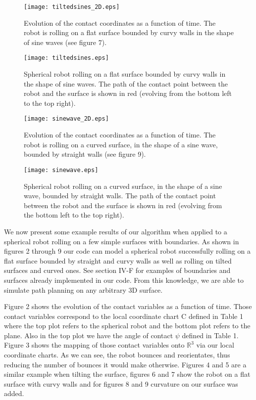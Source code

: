 \documentclass[journal]{IEEEtran}
\begin{document}
\begin{figure}
\centering
    \texttt{[image: tiltedsines\_2D.eps]}
    \caption{Evolution of the contact coordinates as a function of time. The robot is rolling on a flat surface bounded by curvy walls in the shape of sine waves (see figure 7).}
    \label{fig:tiltedsines2D}
\end{figure}
\begin{figure}
\centering
    \texttt{[image: tiltedsines.eps]}
    \caption{Spherical robot rolling on a flat surface bounded by curvy walls in the shape of sine waves. The path of the contact point between the robot and the surface is shown in red (evolving from the bottom left to the top right).}
    \label{fig:tiltedsines3D}
\end{figure}

\begin{figure}
\centering
    \texttt{[image: sinewave\_2D.eps]}
    \caption{Evolution of the contact coordinates as a function of time. The robot is rolling on a curved surface, in the shape of a sine wave, bounded by straight walls (see figure 9).}
    \label{fig:sinewave2D}
\end{figure}
\begin{figure}
\centering
    \texttt{[image: sinewave.eps]}
    \caption{Spherical robot rolling on a curved surface, in the shape of a sine wave, bounded by straight walls. The path of the contact point between the robot and the surface is shown in red (evolving from the bottom left to the top right).}
    \label{fig:sinewave3D}
\end{figure}

We now present some example results of our algorithm when applied to a spherical robot rolling on a few simple surfaces with boundaries. As shown in figures 2 through 9 our code can model a spherical robot successfully rolling on a flat surface bounded by straight and curvy walls as well as rolling on tilted surfaces and curved ones. See section IV-F for examples of boundaries and surfaces already implemented in our code. From this knowledge, we are able to simulate path planning on any arbitrary 3D surface.

Figure 2 shows the evolution of the contact variables as a function of time. Those contact variables correspond to the local coordinate chart C defined in Table 1 where the top plot refers to the spherical robot and the bottom plot refers to the plane. Also in the top plot we have the angle of contact $\psi$ defined in Table 1. Figure 3 shows the mapping of those contact variables onto $\mathbb{R}^3$ via our local coordinate charts. As we can see, the robot bounces and reorientates, thus reducing the number of bounces it would make otherwise. Figures 4 and 5 are a similar example when tilting the surface, figures 6 and 7 show the robot on a flat surface with curvy walls and for figures 8 and 9 curvature on our surface was added.
\end{document}
